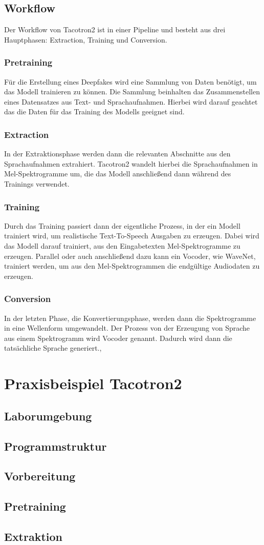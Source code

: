 \subsection{Workflow}
Der Workflow von Tacotron2 ist in einer Pipeline und besteht aus drei Hauptphasen: Extraction, Training und Conversion.
\subsubsection*{Pretraining}
Für die Erstellung eines Deepfakes wird eine Sammlung von Daten benötigt, um das Modell trainieren zu können. Die Sammlung beinhalten das Zusammenstellen eines Datensatzes aus Text- und Sprachaufnahmen. Hierbei wird darauf geachtet das die Daten für das Training des Modells geeignet sind.\cite{Arxiv}
\subsubsection*{Extraction}
In der Extraktionsphase werden dann die relevanten Abschnitte aus den Sprachaufnahmen extrahiert. Tacotron2 wandelt hierbei die Sprachaufnahmen in Mel-Spektrogramme um, die das Modell anschließend dann während des Trainings verwendet.\cite{Arxiv}
\subsubsection*{Training}
Durch das Training passiert dann der eigentliche Prozess, in der ein Modell trainiert wird, um realistische Text-To-Speech Ausgaben zu erzeugen. Dabei wird das Modell darauf trainiert, aus den Eingabetexten Mel-Spektrogramme zu erzeugen. Parallel oder auch anschließend dazu kann ein Vocoder, wie WaveNet, trainiert werden, um aus den Mel-Spektrogrammen die endgültige Audiodaten zu erzeugen.\cite{Arxiv}
\subsubsection*{Conversion}
In der letzten Phase, die Konvertierungsphase, werden dann die Spektrogramme in eine Wellenform umgewandelt. Der Prozess von der Erzeugung von Sprache aus einem Spektrogramm wird Vocoder genannt. Dadurch wird dann die tatsächliche Sprache generiert.\cite{Arxiv},\cite{pytorch}
\section{Praxisbeispiel Tacotron2}
\subsection{Laborumgebung}
\subsection{Programmstruktur}
\subsection{Vorbereitung}
\subsection{Pretraining}
\subsection{Extraktion}